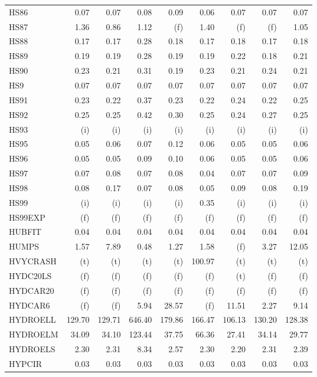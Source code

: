 \documentclass[11pt,twoside]{article}
\begin{document}
{\begin{longtable}[c]{|l|r|r|r|r|r|r|r|r|}
HS86 & 0.07 & 0.07 & 0.08 & 0.09 & 0.06 & 0.07 & 0.07 & 0.07 \\
HS87 & 1.36 & 0.86 & 1.12 & (f) & 1.40 & (f) & (f) & 1.05 \\
HS88 & 0.17 & 0.17 & 0.28 & 0.18 & 0.17 & 0.18 & 0.17 & 0.18 \\
HS89 & 0.19 & 0.19 & 0.28 & 0.19 & 0.19 & 0.22 & 0.18 & 0.21 \\
HS90 & 0.23 & 0.21 & 0.31 & 0.19 & 0.23 & 0.21 & 0.24 & 0.21 \\
HS9 & 0.07 & 0.07 & 0.07 & 0.07 & 0.07 & 0.07 & 0.07 & 0.07 \\
HS91 & 0.23 & 0.22 & 0.37 & 0.23 & 0.22 & 0.24 & 0.22 & 0.25 \\
HS92 & 0.25 & 0.25 & 0.42 & 0.30 & 0.25 & 0.24 & 0.27 & 0.25 \\
HS93 & (i) & (i) & (i) & (i) & (i) & (i) & (i) & (i) \\
HS95 & 0.05 & 0.06 & 0.07 & 0.12 & 0.06 & 0.05 & 0.05 & 0.06 \\
HS96 & 0.05 & 0.05 & 0.09 & 0.10 & 0.06 & 0.05 & 0.05 & 0.06 \\
HS97 & 0.07 & 0.08 & 0.07 & 0.08 & 0.04 & 0.07 & 0.07 & 0.09 \\
HS98 & 0.08 & 0.17 & 0.07 & 0.08 & 0.05 & 0.09 & 0.08 & 0.19 \\
HS99 & (i) & (i) & (i) & (i) & 0.35 & (i) & (i) & (i) \\
HS99EXP & (f) & (f) & (f) & (f) & (f) & (f) & (f) & (f) \\
HUBFIT & 0.04 & 0.04 & 0.04 & 0.04 & 0.04 & 0.04 & 0.04 & 0.04 \\
HUMPS & 1.57 & 7.89 & 0.48 & 1.27 & 1.58 & (f) & 3.27 & 12.05 \\
HVYCRASH & (t) & (t) & (t) & (t) & 100.97 & (t) & (t) & (t) \\
HYDC20LS & (f) & (f) & (f) & (f) & (f) & (t) & (f) & (f) \\
HYDCAR20 & (f) & (f) & (f) & (f) & (f) & (f) & (f) & (f) \\
HYDCAR6 & (f) & (f) & 5.94 & 28.57 & (f) & 11.51 & 2.27 & 9.14 \\
HYDROELL & 129.70 & 129.71 & 646.40 & 179.86 & 166.47 & 106.13 & 130.20 & 128.38 \\
HYDROELM & 34.09 & 34.10 & 123.44 & 37.75 & 66.36 & 27.41 & 34.14 & 29.77 \\
HYDROELS & 2.30 & 2.31 & 8.34 & 2.57 & 2.30 & 2.20 & 2.31 & 2.39 \\
HYPCIR & 0.03 & 0.03 & 0.03 & 0.03 & 0.03 & 0.03 & 0.03 & 0.03 \\

\end{longtable}}
\end{document}
